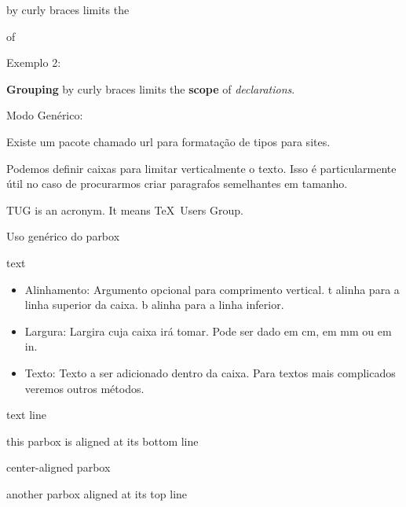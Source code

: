 \documentclass[a4paper, 12pt]{article}
\begin{document}
 by curly braces limits the

 of 

Exemplo 2:

\renewcommand{\keyword}[2][\bfseries]{{#1#2}}
\keyword{Grouping} by curly braces limits the
\keyword{scope} of \keyword[\itshape]{declarations}.

Modo Genérico:

Existe um pacote chamado url para formatação de tipos para sites.

Podemos definir caixas para limitar verticalmente o texto.
Isso é particularmente útil no caso de procurarmos criar paragrafos semelhantes em tamanho.

\parbox{3cm}{TUG is an acronym. It means \TeX\ Users Group.}

Uso genérico do parbox \parbox[alignment]{width}{text}
\begin{itemize}
        \item Alinhamento: Argumento opcional para comprimento vertical.
        t alinha para a linha superior da caixa.
        b alinha para a linha inferior.
        \item Largura: Largira cuja caixa irá tomar. Pode ser dado em cm, em mm ou em in.
        \item Texto: Texto a ser adicionado dentro da caixa.
        Para textos mais complicados veremos outros métodos.
\end{itemize}

text line
\quad\parbox[b]{1.8cm}{this parbox is aligned at its bottom line}
\quad\parbox{1.5cm}{center-aligned parbox}
\quad\parbox[t]{2cm}{another parbox aligned at its top line}

\end{document}
